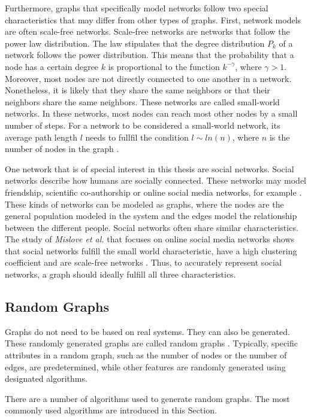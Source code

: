 Furthermore, graphs that specifically model networks follow two special 
characteristics that may differ from other types of graphs.
First, network models are often scale-free networks.
Scale-free networks are networks that follow the power law distribution.
The law stipulates that the degree distribution $P_k$ of a network
follows the power distribution.
This means that the probability that a node has a certain degree $k$ 
is proportional to the function $k^{-\gamma}$, where
$\gamma>1$.
Moreover, most nodes are not directly connected to one another in a network.
Nonetheless, it is likely that they share the same neighbors or that their
neighbors share the same neighbors. These networks are called small-world 
networks. In these networks, most nodes can reach most other
nodes by a small number of steps. For a network
to be considered a small-world network, its average path length $l$ 
needs to fullfil the condition $l\sim ln(n)$, where $n$ is the number
of nodes in the graph \cite{wattsmodel}.

One network that is of special interest in this thesis are social networks.
Social networks describe how humans are socially connected. 
These networks may model friendship, scientific co-authorship 
or online social media networks, for example \cite{basicnetwork}. 
These kinds of networks can be modeled as graphs, where the nodes 
are the general population modeled in the system
and the edges model the relationship between the 
different people.
Social networks often share similar characteristics. The study of 
\textit{Mislove et al.} that focuses on online social media networks
shows that social networks fulfill the small world characteristic,
have a high clustering coefficient and are scale-free networks
\cite{mislovesocialnetworkcharacteristics}. Thus, to accurately represent 
social networks, a graph should ideally fulfill all three characteristics.

\subsection{Random Graphs}
\label{randomgraphssection}
Graphs do not need to be based on real systems. They can also be generated. 
These randomly generated graphs are called random graphs \cite{randomgraphs}.
Typically, specific attributes in a random graph, such as the number of nodes 
or the number of edges, are predetermined, 
while other features are randomly generated using designated algorithms.

There are a number of algorithms used to generate random graphs.
The most commonly used algorithms are introduced in this Section.


